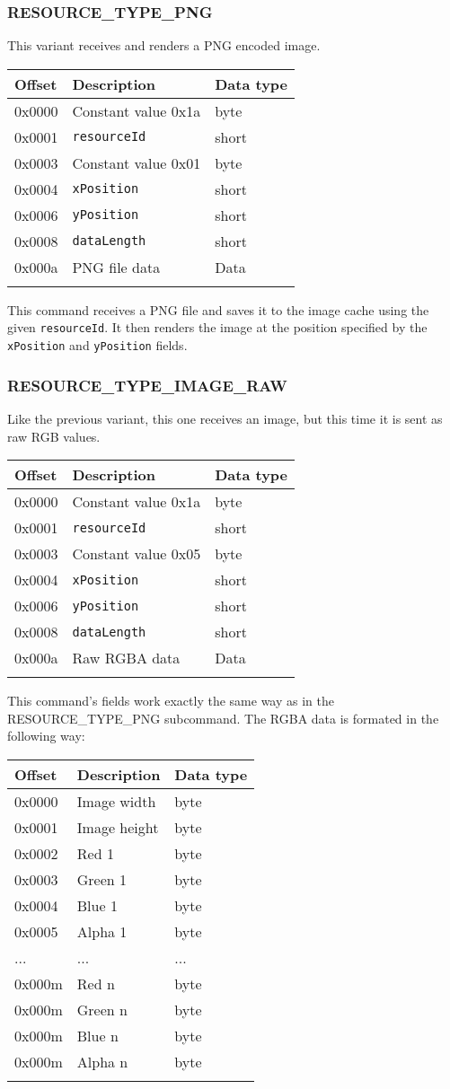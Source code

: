 \documentclass{article}
\newcommand{\field}[1]{\textcolor{fieldColor}{\texttt{#1}}}
\newenvironment{bytelisting}
{\ttfamily \begin{center} \begin{tabular}{l l l} Offset & Description & Data type \\ \hline}
{\normalfont \end{tabular} \end{center}}
\begin{document}
\subsubsection{RESOURCE\_TYPE\_PNG}
This variant receives and renders a PNG encoded image.

\begin{bytelisting}
0x0000 & Constant value 0x1a & byte \\
0x0001 & \field{resourceId} & short \\
0x0003 & Constant value 0x01 & byte \\
0x0004 & \field{xPosition} & short \\
0x0006 & \field{yPosition} & short \\
0x0008 & \field{dataLength} & short \\
0x000a & PNG file data & Data \\
\end{bytelisting}

This command receives a PNG file and saves it to the image cache using the given \field{resourceId}. It then renders the image at the position specified by the \field{xPosition} and \field{yPosition} fields. 

\subsubsection{RESOURCE\_TYPE\_IMAGE\_RAW}
Like the previous variant, this one receives an image, but this time it is sent as raw RGB values.

\begin{bytelisting}
0x0000 & Constant value 0x1a & byte \\
0x0001 & \field{resourceId} & short \\
0x0003 & Constant value 0x05 & byte \\
0x0004 & \field{xPosition} & short \\
0x0006 & \field{yPosition} & short \\
0x0008 & \field{dataLength} & short \\
0x000a & Raw RGBA data & Data \\
\end{bytelisting}

This command's fields work exactly the same way as in the RESOURCE\_TYPE\_PNG subcommand. The RGBA data is formated in the following way:

\begin{bytelisting}
0x0000 & Image width & byte \\
0x0001 & Image height & byte \\
0x0002 & Red 1 & byte \\
0x0003 & Green 1 & byte \\
0x0004 & Blue 1 & byte \\
0x0005 & Alpha 1 & byte \\
... & ... & ... \\
0x000m & Red n & byte \\
0x000m & Green n & byte \\
0x000m & Blue n & byte \\
0x000m & Alpha n & byte \\
\end{bytelisting}
\end{document}
